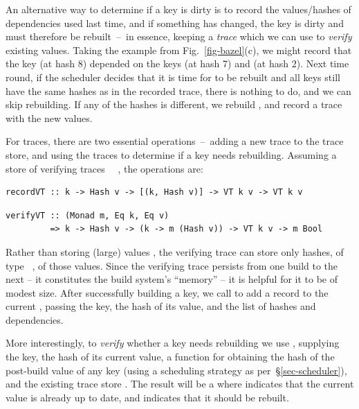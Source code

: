 An alternative way to determine if a key is dirty is to record the
values/hashes of dependencies used last time, and if something has changed, the
key is dirty and must therefore be rebuilt~--~in essence, keeping a \emph{trace}
which we can use to \emph{verify} existing values. Taking the example from
Fig.~\ref{fig-bazel}(c), we might record that the key  (at hash 8)
depended on the keys  (at hash 7) and  (at hash 2). Next
time round, if the scheduler decides that it is time for  to be
rebuilt and all keys still have the same hashes as in the recorded trace, there
is nothing to do, and we can skip rebuilding. If any of the hashes is different,
we rebuild , and record a trace with the new values.

For traces, there are two essential operations~--~adding a new trace to the
trace store, and using the traces to determine if a key needs rebuilding.
Assuming a store of verifying traces ~~, the operations are:

\vspace{1mm}
\begin{verbatim}
recordVT :: k -> Hash v -> [(k, Hash v)] -> VT k v -> VT k v
\end{verbatim}
\vspace{-2mm}
\begin{verbatim}
verifyVT :: (Monad m, Eq k, Eq v)
         => k -> Hash v -> (k -> m (Hash v)) -> VT k v -> m Bool
\end{verbatim}
\vspace{1mm}

\noindent
Rather than storing (large) values , the verifying trace  can store
only hashes, of type ~, of those values. Since the verifying
trace persists from one build to the next -- it constitutes the build system's
``memory'' -- it is helpful for it to be of modest size. After successfully
building a key, we call  to add a record to the current ,
passing the key, the hash of its value, and the list of hashes and dependencies.

More interestingly, to \emph{verify} whether a key needs rebuilding we use
, supplying the key, the hash of its current value, a function for
obtaining the hash of the post-build value of any key (using a scheduling
strategy as per~\S\ref{sec-scheduler}), and the existing trace store .
The result will be a  where  indicates that the current value
is already up to date, and  indicates that it should be rebuilt.

